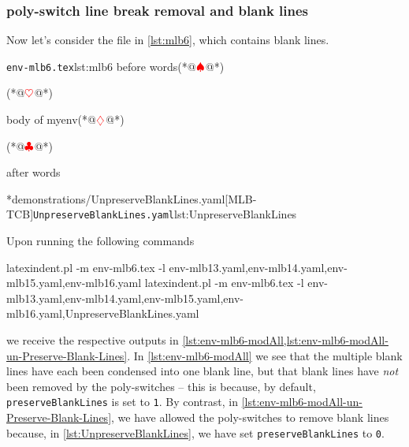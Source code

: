 \subsubsection{poly-switch line break removal and blank lines}
	Now let's consider the file in \cref{lst:mlb6}, which contains blank lines.

        \begin{cmhtcbraster}
		\begin{cmhlistings}[style=tcblatex,escapeinside={(*@}{@*)}]{\texttt{env-mlb6.tex}}{lst:mlb6}
before words(*@$\color{red}\spadesuit$@*)


\begin{myenv}(*@$\color{red}\heartsuit$@*)


body of myenv(*@$\color{red}\diamondsuit$@*)


\end{myenv}(*@$\color{red}\clubsuit$@*)

after words
\end{cmhlistings}
		\cmhlistingsfromfile[style=yaml-LST]*{demonstrations/UnpreserveBlankLines.yaml}[MLB-TCB]{\texttt{UnpreserveBlankLines.yaml}}{lst:UnpreserveBlankLines}
        \end{cmhtcbraster}

	Upon running the following commands
	\begin{widepage}
		\begin{commandshell}
latexindent.pl -m env-mlb6.tex -l env-mlb13.yaml,env-mlb14.yaml,env-mlb15.yaml,env-mlb16.yaml
latexindent.pl -m env-mlb6.tex -l env-mlb13.yaml,env-mlb14.yaml,env-mlb15.yaml,env-mlb16.yaml,UnpreserveBlankLines.yaml
\end{commandshell}
	\end{widepage}
	we receive the respective outputs in \cref{lst:env-mlb6-modAll,lst:env-mlb6-modAll-un-Preserve-Blank-Lines}. In
	\cref{lst:env-mlb6-modAll} we see that the multiple blank lines have each been condensed
	into one blank line, but that blank lines have \emph{not} been removed
	by the poly-switches -- this is because, by default, \texttt{preserveBlankLines} is set
	to \texttt{1}. By contrast, in \cref{lst:env-mlb6-modAll-un-Preserve-Blank-Lines}, we have
	allowed the poly-switches to remove blank lines because, in \cref{lst:UnpreserveBlankLines},
	we have set \texttt{preserveBlankLines} to \texttt{0}.

        \begin{cmhtcbraster}[ raster left skip=-3.5cm,
                             raster right skip=-2cm,
            raster force size=false,
            raster column 1/.style={add to width=-.2\textwidth},
            raster column 2/.style={add to width=.2\textwidth},
                             raster column skip=.06\linewidth]
        \end{cmhtcbraster}

